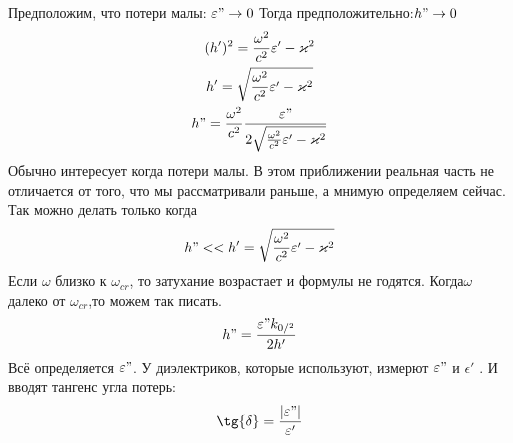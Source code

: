 \begin{enumerate}
	Предположим, что потери малы: $\epsilon"  \rightarrow 0 $
	Тогда предположительно:$h"  \rightarrow 0 $
	\begin{gather}
		(h')^2 = \frac{\omega^2}{c^2} \epsilon' - \kappa^2\\
		h' = \sqrt{\frac{\omega^2}{c^2} \epsilon' - \kappa^2}\\
		h" = \frac{\omega^2}{c^2} \frac{\epsilon"}{2 \sqrt{\frac{\omega^2}{c^2} \epsilon' - \kappa^2}}
	\end{gather}
	Обычно интересует когда потери малы.
	В этом приближении реальная часть не отличается от того, что мы рассматривали раньше, а мнимую определяем сейчас.
	Так можно делать только когда
	\begin{equation}
		h" << h' = \sqrt{\frac{\omega^2}{c^2} \epsilon' - \kappa^2}
	\end{equation}
	Если $\omega$ близко к $\omega_{cr}$, то затухание возрастает и формулы не годятся.
	Когда$\omega$ далеко от $\omega_{cr}$,то можем так писать.
	\begin{equation}
		h" = \frac{\epsilon" k_{0/^2}}{2 h'}
	\end{equation}
	Всё определяется $\epsilon"$. У диэлектриков, которые используют, измерют $\epsilon"$ и $\epsilon'$ .
	И вводят тангенс угла потерь:
	\begin{equation}
		\tg{\delta} = \frac{|\varepsilon"|}{\epsilon'}
	\end{equation}


\end{enumerate}
